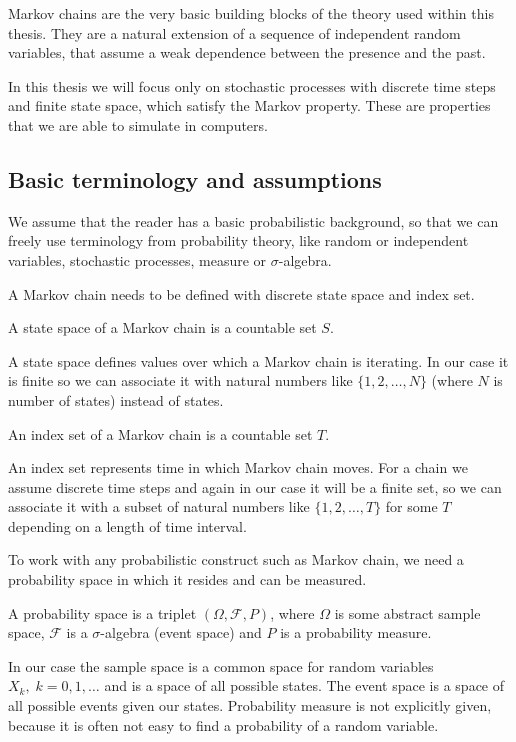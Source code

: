 Markov chains are the very basic building blocks of the theory used within this thesis. They are a natural extension of a sequence of independent random variables, that assume a weak dependence between the presence and the past.

In this thesis we will focus only on stochastic processes  with discrete time steps and finite state space, which satisfy the Markov property. These are properties that we are able to simulate in computers.

\subsection{Basic terminology and assumptions}
	We assume that the reader has a basic probabilistic background, so that we can freely use terminology from probability theory, like random or independent variables, stochastic processes, measure or $\sigma$-algebra.
	
	A Markov chain needs to be defined with discrete state space and index set.
	\begin{definition}
		A state space of a Markov chain is a countable set $S$.
	\end{definition}
	A state space defines values over which a Markov chain is iterating. In our case it is finite so we can associate it with natural numbers like $\{1, 2, \ldots, N\}$ (where $N$ is number of states) instead of states.
	
	\begin{definition}
		An index set of a Markov chain is a countable set $T$.
	\end{definition}
	An index set represents time in which Markov chain moves. For a chain we assume discrete time steps and again in our case it will be a finite set, so we can associate it with a subset of natural numbers like $\{1, 2, \ldots, T\}$ for some $T$ depending on a length of time interval.
	
	To work with any probabilistic construct such as Markov chain, we need a probability space in which it resides and can be measured.
	\begin{definition}
		A probability space is a triplet $\left( \Omega, \mathcal{F}, P \right)$, where $\Omega$ is some abstract sample space, $\mathcal{F}$ is a $\sigma$-algebra (event space) and $P$ is a probability measure.
	\end{definition}
	In our case the sample space is a common space for random variables $X_k, \; k=0,1,\ldots$ and is a space of all possible states. The event space is a space of all possible events given our states. Probability measure is not explicitly given, because it is often not easy to find a probability of a random variable.
	
